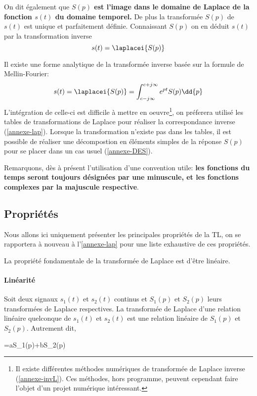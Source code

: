 On dit également que \textbf{$S(p)$ est l'image dans le domaine de 
Laplace de la fonction $s(t)$ du domaine temporel.}
De plus la transformée $S(p)$ de $s(t)$ est unique et parfaitement définie. 
Connaissant $S(p)$ on en déduit $s(t)$
par la transformation inverse 
$$
s(t)=\laplacei{S(p)}
$$

Il existe une forme analytique de la transformée inverse basée sur
la formule de Mellin-Fourier\cite{Ostertag}:
$$
s(t)=\laplacei{S(p)}=\int_{c-j\infty}^{c+j\infty} e^{pt}S(p)\dd{p}
$$
L'intégration de celle-ci est difficile à mettre en oeuvre\footnote{
Il existe différentes méthodes numériques de transformée de Laplace inverse (\cref{annexe-invL}).
Ces méthodes, hors programme, peuvent cependant faire l'objet d'un projet numérique
intéressant.}, on préferera utilisé
les tables de transformations de Laplace pour réaliser la correspondance inverse (\cref{annexe-lap}).
Lorsque la transformation
n'existe pas dans les tables, il est possible de réaliser une décompostion en éléments 
simples de la réponse $S(p)$ pour se placer dans un cas usuel (\cref{annexe-DES}).

Remarquons, dès à présent l'utilisation d'une convention utile: 
\textbf{les fonctions du temps seront toujours désignées par une
minuscule, et les fonctions complexes par la majuscule respective}.

\subsection{Propriétés}
Nous allons ici uniquement présenter les principales propriétés de la TL, 
on se rapportera à nouveau à l'\cref{annexe-lap} pour 
une liste exhaustive de ces propriétés.

La propriété fondamentale de la transformée de Laplace est d'être linéaire.
\paragraph{Linéarité}
Soit deux signaux $s_1(t)$ et $s_2(t)$ continus et $S_1(p)$ et $S_2(p)$ leurs
transformées de Laplace respectives. La transformée de Laplace d'une 
relation linéaire quelconque de $s_1(t)$ et $s_2(t)$ est une relation linéaire 
de $S_1(p)$ et $S_2(p)$. Autrement dit,
\begin{bequation}
	=aS_1(p)+bS_2(p)
\end{bequation}

